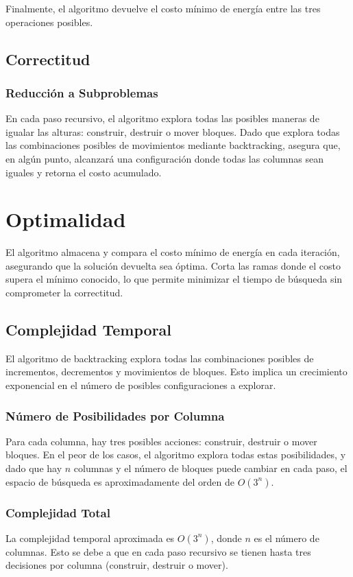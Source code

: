 \documentclass[a4paper,12pt]{article}
\begin{document}
Finalmente, el algoritmo devuelve el costo mínimo de energía entre las tres operaciones posibles.

\subsection{Correctitud}
\subsubsection{Reducción a Subproblemas}
En cada paso recursivo, el algoritmo explora todas las posibles maneras de igualar las alturas: construir, destruir o mover bloques. Dado que explora todas las combinaciones posibles de movimientos mediante backtracking, asegura que, en algún punto, alcanzará una configuración donde todas las columnas sean iguales y retorna el costo acumulado.

\section{Optimalidad}

El algoritmo almacena y compara el costo mínimo de energía en cada iteración, asegurando que la solución devuelta sea óptima. Corta las ramas donde el costo supera el mínimo conocido, lo que permite minimizar el tiempo de búsqueda sin comprometer la correctitud.

\subsection{Complejidad Temporal}
El algoritmo de backtracking explora todas las combinaciones posibles de incrementos, decrementos y movimientos de bloques. Esto implica un crecimiento exponencial en el número de posibles configuraciones a explorar.

\subsubsection{Número de Posibilidades por Columna}
Para cada columna, hay tres posibles acciones: construir, destruir o mover bloques. En el peor de los casos, el algoritmo explora todas estas posibilidades, y dado que hay \( n \) columnas y el número de bloques puede cambiar en cada paso, el espacio de búsqueda es aproximadamente del orden de \( O(3^n) \).

\subsubsection{Complejidad Total}
La complejidad temporal aproximada es \( O(3^n) \), donde \( n \) es el número de columnas. Esto se debe a que en cada paso recursivo se tienen hasta tres decisiones por columna (construir, destruir o mover).
\end{document}
